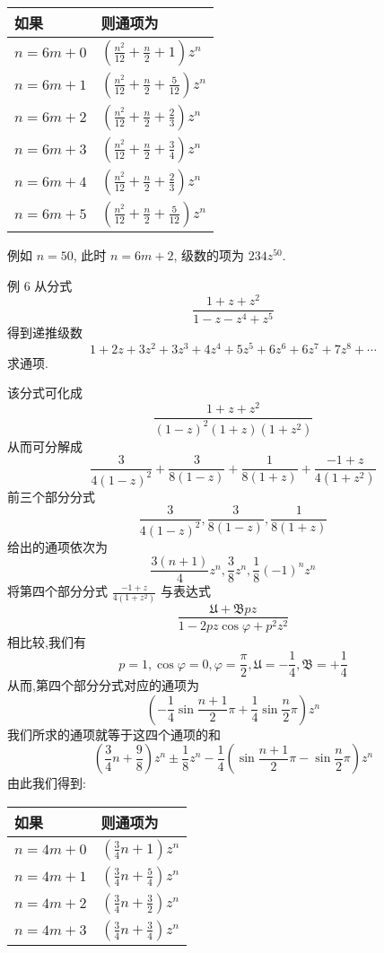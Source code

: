 \begin{tabular}{l|l}
\hline 如果 & 则通项为 \\
\hline$n=6 m+0$ & $\left(\frac{n^{2}}{12}+\frac{n}{2}+1\right) z^{n}$ \\
\hline$n=6 m+1$ & $\left(\frac{n^{2}}{12}+\frac{n}{2}+\frac{5}{12}\right) z^{n}$ \\
\hline$n=6 m+2$ & $\left(\frac{n^{2}}{12}+\frac{n}{2}+\frac{2}{3}\right) z^{n}$ \\
\hline$n=6 m+3$ & $\left(\frac{n^{2}}{12}+\frac{n}{2}+\frac{3}{4}\right) z^{n}$ \\
\hline$n=6 m+4$ & $\left(\frac{n^{2}}{12}+\frac{n}{2}+\frac{2}{3}\right) z^{n}$ \\
\hline$n=6 m+5$ & $\left(\frac{n^{2}}{12}+\frac{n}{2}+\frac{5}{12}\right) z^{n}$ \\
\hline
\end{tabular}

例如 $n=50$, 此时 $n=6 m+2$, 级数的项为 $234 z^{50}$.

例 6 从分式
\[
\frac{1+z+z^{2}}{1-z-z^{4}+z^{5}}
\]
得到递推级数
\[
1+2 z+3 z^{2}+3 z^{3}+4 z^{4}+5 z^{5}+6 z^{6}+6 z^{7}+7 z^{8}+\cdots
\]
求通项.

该分式可化成
\[
\frac{1+z+z^{2}}{(1-z)^{2}(1+z)\left(1+z^{2}\right)}
\]
从而可分解成
\[
\frac{3}{4(1-z)^{2}}+\frac{3}{8(1-z)}+\frac{1}{8(1+z)}+\frac{-1+z}{4\left(1+z^{2}\right)}
\]
前三个部分分式
\[
\frac{3}{4(1-z)^{2}}, \frac{3}{8(1-z)}, \frac{1}{8(1+z)}
\]
给出的通项依次为
\[
\frac{3(n+1)}{4} z^{n}, \frac{3}{8} z^{n}, \frac{1}{8}(-1)^{n} z^{n}
\]
将第四个部分分式 $\frac{-1+z}{4\left(1+z^{2}\right)}$ 与表达式
\[
\frac{\mathfrak{U}+\mathfrak{B} p z}{1-2 p z \cos \varphi+p^{2} z^{2}}
\]
相比较,我们有
\[
p=1, \cos \varphi=0, \varphi=\frac{\pi}{2}, \mathfrak{U}=-\frac{1}{4}, \mathfrak{B}=+\frac{1}{4}
\]
从而,第四个部分分式对应的通项为
\[
\left(-\frac{1}{4} \sin \frac{n+1}{2} \pi+\frac{1}{4} \sin \frac{n}{2} \pi\right) z^{n}
\]
我们所求的通项就等于这四个通项的和
\[
\left(\frac{3}{4} n+\frac{9}{8}\right) z^{n} \pm \frac{1}{8} z^{n}-\frac{1}{4}\left(\sin \frac{n+1}{2} \pi-\sin \frac{n}{2} \pi\right) z^{n}
\]
由此我们得到:

\begin{tabular}{l|l}
\hline 如果 & 则通项为 \\
\hline$n=4 m+0$ & $\left(\frac{3}{4} n+1\right) z^{n}$ \\
\hline$n=4 m+1$ & $\left(\frac{3}{4} n+\frac{5}{4}\right) z^{n}$ \\
\hline$n=4 m+2$ & $\left(\frac{3}{4} n+\frac{3}{2}\right) z^{n}$ \\
\hline$n=4 m+3$ & $\left(\frac{3}{4} n+\frac{3}{4}\right) z^{n}$ \\
\hline
\end{tabular}

